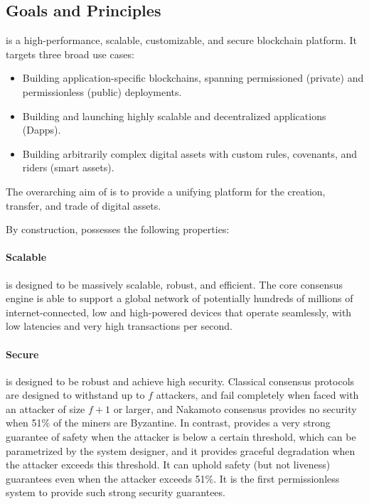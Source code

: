 \documentclass[runningheads]{llncs}
\begin{document}
\subsection{\AVAPlatformName{} Goals and Principles}
\AVAPlatformName{} is a high-performance, scalable, customizable, and secure blockchain platform. It targets three broad use cases:
\begin{itemize}
\item{} Building application-specific blockchains, spanning permissioned (private) and permissionless (public) deployments.
\item{} Building and launching highly scalable and decentralized applications (Dapps).
\item{} Building arbitrarily complex digital assets with custom rules, covenants, and riders (smart assets). 
\end{itemize}
The overarching aim of \AVAPlatformName{} is to provide a unifying platform for the creation, transfer, and trade of digital assets. 

\noindent By construction, \AVAPlatformName{} possesses the following properties:

\paragraph{Scalable} \AVAPlatformName{} is designed to be massively scalable, robust, and efficient. The core consensus engine is able to support a global network of potentially hundreds of millions of internet-connected, low and high-powered devices that operate seamlessly, with low latencies and very high transactions per second.

\paragraph{Secure} \AVAPlatformName{}{} is designed to be robust and achieve high security. Classical consensus protocols are designed to withstand up to $f$ attackers, and fail completely when faced with an attacker of size $f+1$ or larger, and Nakamoto consensus provides no security when 51\% of the miners are Byzantine. In contrast, \AVAPlatformName{} provides a very strong guarantee of safety when the attacker is below a certain threshold, which can be parametrized by the system designer, and it provides graceful degradation when the attacker exceeds this threshold. It can uphold safety (but not liveness) guarantees even when the attacker exceeds 51\%. It is the first permissionless system to provide such strong security guarantees.
\end{document}

